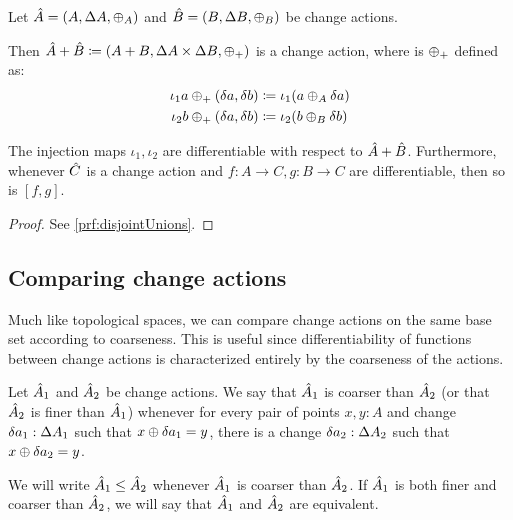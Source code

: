 \begin{prop}[name=Disjoint unions, restate=disjointUnions]
  \label{prop:disjointUnions}
  Let $\hat{A} = (A,\Delta A,\oplus_A)$ and $\hat{B} =
  (B,\Delta B,\oplus_B)$ be change actions.

  Then $\hat{A} + \hat{B} \coloneqq (A + B,\Delta A \times
  \Delta B,\oplus_{+})$ is a change action, where is $\oplus_{+}$ defined as:
  \begin{align*}
    \iota_1 a \oplus_{+} (\delta a, \delta b) &\coloneqq \iota_1 (a \oplus_A \delta a)\\
    \iota_2 b \oplus_{+} (\delta a, \delta b) &\coloneqq \iota_2 (b \oplus_B \delta b)
  \end{align*}
  
  The injection maps $\iota_1, \iota_2$ are differentiable with respect to $\hat{A} + \hat{B}$. Furthermore,
  whenever $\hat{C}$ is a change action and $f : A \rightarrow C, g: B \rightarrow C$ are differentiable,
  then so is $\left[ f, g \right]$.
\end{prop}
\ifproofs
\begin{proof}
  See \cref{prf:disjointUnions}.
\end{proof}
\fi

\subsection{Comparing change actions}

Much like topological spaces, we can compare change actions on the same
base set according to coarseness. This 
is useful since differentiability of functions between change actions is characterized
entirely by the coarseness of the actions.

\begin{defn}
  Let $\hat{A}_1$ and $ \hat{A}_2$ be 
  change actions. We say that $\hat{A}_1$ is coarser than $\hat{A}_2$ (or that $\hat{A}_2$ is finer
  than $\hat{A}_1$) whenever for every pair of points $x, y : A$ and change $\delta a_1 : \Delta A_1$
  such that $x \oplus \delta a_1 = y$, there is a change $\delta a_2 : \Delta A_2$ such that $x \oplus \delta a_2 = y$.
  
  We will write $\hat{A}_1 \leq \hat{A}_2$ whenever $\hat{A}_1$ is coarser than $\hat{A}_2$.
  If $\hat{A}_1$ is both finer and coarser than $\hat{A}_2$, we will say that $\hat{A}_1$
  and $\hat{A}_2$ are equivalent.
\end{defn}

